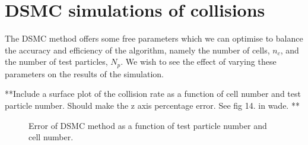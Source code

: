 
\section{DSMC simulations of collisions}

The DSMC method offers some free parameters which we can optimise to balance the accuracy and efficiency of the algorithm, namely the number of cells, $n_c$, and the number of test particles, $N_p$.
We wish to see the effect of varying these parameters on the results of the simulation.

**Include a surface plot of the collision rate as a function of cell number and test particle number.
Should make the z axis percentage error. See fig 14. in wade. **

\begin{figure}
\hspace{-8em}
\caption{Error of DSMC method as a function of test particle number and cell number.}\label{fig:dsmccolerr}
\end{figure}


